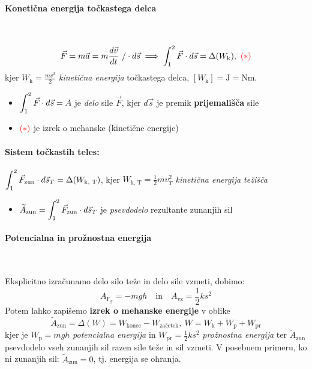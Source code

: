 \paragraph{Konetična energija točkastega delca} \ 

\[\vec{F} = m \vec{a} = m \frac{d \vec{v}}{dt} \ / \cdot d \vec{s} \implies \int_{1}^{2} \vec{F} \cdot d \vec{s} = \Delta(W_\text{k}), \ \textcolor{red}{(*)}\]
kjer \(W_\text{k} = \frac{mv^2}{2}\) \emph{kinetična energija} točkastega delca, \([W_\text{k}] = \text{J} = \text{Nm}\).
\begin{itemize}
    \item \(\displaystyle \int_{1}^{2} \vec{F} \cdot d \vec{s} = A\) je \emph{delo} sile \(\vec{F}\), kjer \(d \vec{s}\) je premik \textbf{prijemališča} sile
    \item \(\textcolor{red}{(*)}\) je izrek o mehanske (kinetične energije)
\end{itemize}

\paragraph{Sistem točkastih teles: } \(\displaystyle \int_{1}^{2} \vec{F}_\text{zun} \cdot d \vec{s}_T = \Delta(W_\text{k, T})\), kjer \(W_\text{k, T}= \frac{1}{2} mv^2_T\) \emph{kinetična energija težišča}
\begin{itemize}
    \item \(\displaystyle \widetilde{A}_\text{zun} = \int_{1}^{2} \vec{F}_\text{zun} \cdot d \vec{s}_T \) je \emph{psevdodelo} rezultante zunanjih sil
\end{itemize}

\paragraph{Potencialna in prožnostna energija} \ 

Eksplicitno izračunamo delo silo teže in delo sile vzmeti, dobimo:
\[A_{\text{F}_g} = - mgh \quad \text{in} \quad A_\text{vz} = \frac{1}{2}k s^2\]
Potem lahko zapišemo \textbf{izrek o mehanske energije} v oblike
\[\boxed{\widetilde{A}_\text{zun} = \Delta(W) = W_\text{konec} - W_\text{začetek}, \ W = W_\text{k} + W_\text{p} + W_\text{pr}}\]
kjer je \(W_\text{p} = mgh\) \emph{potencialna energija} in \(W_\text{pr} = \frac{1}{2} k s^2\) \emph{prožnostna energija} ter \(\widetilde{A}_\text{zun}\) psevdodelo vseh zunanjih sil razen sile teže in sil vzmeti. V posebnem primeru, ko ni zunanjih sil: \(\widetilde{A}_\text{zun} = 0\), tj. energija se ohranja.

